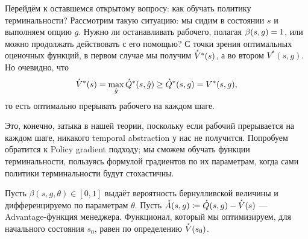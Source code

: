 Перейдём к оставшемся открытому вопросу: как обучать политику терминальности? Рассмотрим такую ситуацию: мы сидим в состоянии $s$ и выполняем опцию $g$. Нужно ли останавливать рабочего, полагая $\beta(s, g) \HM= 1$, или можно продолжать действовать с его помощью? С точки зрения оптимальных оценочных функций, в первом случае мы получим $\accentset{\star}{V}^*(s)$, а во втором $V^*(s, g)$. Но очевидно, что
$$\accentset{\star}{V}^*(s) = \max_{\hat{g}} \accentset{\star}{Q}^*(s, \hat{g}) \ge \accentset{\star}{Q}^*(s, g) = V^*(s, g),$$
то есть оптимально прерывать рабочего на каждом шаге.

Это, конечно, затыка в нашей теории, поскольку если рабочий прерывается на каждом шаге, никакого temporal abstraction у нас не получится. Попробуем обратится к Policy gradient подходу; мы сможем обучать функции терминальности, пользуясь формулой градиентов по их параметрам, когда сами политики терминальности будут стохастичны. 

Пусть $\beta(s, g, \theta) \in [0, 1]$ выдаёт вероятность бернулливской величины и дифференцируемо по параметрам $\theta$. Пусть $\manager{A}(s, g) \coloneqq \manager{Q}(s, g) \HM- \manager{V}(s)$ --- Advantage-функция менеджера. Функционал, который мы оптимизируем, для начального состояния $s_0$, равен по определению $\accentset{\star}{V}(s_0)$.

